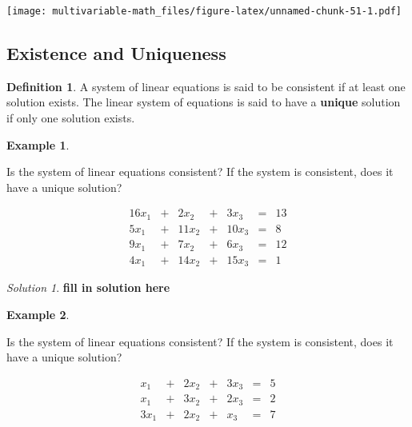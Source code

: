 \documentclass[
]{book}
\theoremstyle{definition}
\newtheorem{definition}{Definition}[chapter]
\theoremstyle{definition}
\newtheorem{example}{Example}[chapter]
\theoremstyle{definition}
\theoremstyle{remark}
\newtheorem*{solution}{Solution}
\begin{document}
\texttt{[image: multivariable-math\_files/figure-latex/unnamed-chunk-51-1.pdf]}

\hypertarget{existence-and-uniqueness}{%
\subsection{Existence and Uniqueness}\label{existence-and-uniqueness}}

\begin{definition}
\protect\hypertarget{def:unnamed-chunk-52}{}{\label{def:unnamed-chunk-52} }A system of linear equations is said to be consistent if at least one solution exists. The linear system of equations is said to have a \textbf{unique} solution if only one solution exists.
\end{definition}

\begin{example}
\protect\hypertarget{exm:unlabeled-div-55}{}\label{exm:unlabeled-div-55}

Is the system of linear equations consistent? If the system is consistent, does it have a unique solution?

\[
\begin{alignedat}{4}  16 x_1 & {}+{} & 2 x_2 & {}+{} & 3 x_3 & {}={} & 13\\ 5 x_1 & {}+{} & 11 x_2 & {}+{} & 10 x_3 & {}={} & 8\\ 9 x_1 & {}+{} & 7 x_2 & {}+{} & 6 x_3 & {}={} & 12\\ 4 x_1 & {}+{} & 14 x_2 & {}+{} & 15 x_3 & {}={} & 1 \end{alignedat}
\]

\end{example}

\begin{solution}

\textbf{fill in solution here}

\end{solution}

\begin{example}
\protect\hypertarget{exm:unlabeled-div-56}{}\label{exm:unlabeled-div-56}

Is the system of linear equations consistent? If the system is consistent, does it have a unique solution?

\[
\begin{alignedat}{4}   x_1 & {}+{} & 2 x_2 & {}+{} & 3 x_3 & {}={} & 5\\  x_1 & {}+{} & 3 x_2 & {}+{} & 2 x_3 & {}={} & 2\\ 3 x_1 & {}+{} & 2 x_2 & {}+{} &  x_3 & {}={} & 7 \end{alignedat}
\]

\end{example}
\end{document}
